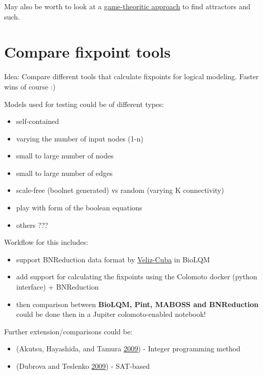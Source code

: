 \documentclass[12pt,]{book}
\providecommand{\tightlist}{%
  \setlength{\itemsep}{0pt}\setlength{\parskip}{0pt}}
\begin{document}
May also be worth to look at a \href{https://doi.org/10.1007/11885191_18}{game-theoritic approach}
to find attractors and such.

\hypertarget{comp}{%
\section{Compare fixpoint tools}\label{comp}}

Idea: Compare different tools that calculate fixpoints for logical modeling.
Faster wins of course :)

Models used for testing could be of different types:

\begin{itemize}
\tightlist
\item
  self-contained
\item
  varying the number of input nodes (1-n)
\item
  small to large number of nodes
\item
  small to large number of edges
\item
  scale-free (boolnet generated) vs random (varying K connectivity)
\item
  play with form of the boolean equations
\item
  others ???
\end{itemize}

Workflow for this includes:

\begin{itemize}
\tightlist
\item
  support BNReduction data format by \href{https://doi.org/10.1186/1471-2105-15-221}{Veliz-Cuba}
  in BioLQM
\item
  add support for calculating the fixpoints using the Colomoto docker (python
  interface) + BNReduction
\item
  then comparison between \textbf{BioLQM, Pint, MABOSS and BNReduction} could be done then
  in a Jupiter colomoto-enabled notebook!
\end{itemize}

Further extension/comparisons could be:

\begin{itemize}
\tightlist
\item
  (Akutsu, Hayashida, and Tamura \protect\hyperlink{ref-Akutsu2009}{2009}) - Integer programming method
\item
  (Dubrova and Teslenko \protect\hyperlink{ref-Dubrova2009}{2009}) - SAT-based
\end{itemize}
\end{document}

